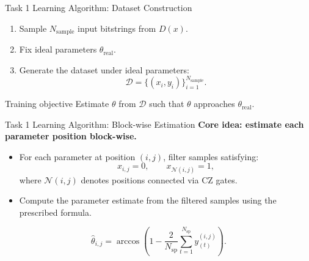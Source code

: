 \documentclass[aspectratio=169]{beamer}
\begin{document}
\begin{frame}{Task 1 Learning Algorithm: Dataset Construction}
  \begin{enumerate}
    \item Sample $N_{\mathrm{sample}}$ input bitstrings from $D(x)$.
    \item Fix ideal parameters $\theta_{\mathrm{real}}$.
    \item Generate the dataset under ideal parameters:
    \[
      \mathcal D = \{(x_i,y_i)\}_{i=1}^{N_{\mathrm{sample}}}.
    \]
  \end{enumerate}

  \vspace{0.25em}
  \begin{block}{Training objective}
    Estimate $\theta$ from $\mathcal D$ such that $\theta$ approaches $\theta_{\mathrm{real}}$.
  \end{block}
\end{frame}

\begin{frame}{Task 1 Learning Algorithm: Block-wise Estimation}
  \small
  {\bfseries Core idea: estimate each parameter position block-wise.}
  \begin{itemize}
    \item For each parameter at position $(i,j)$, filter samples satisfying:
    \[
      x_{i,j}=0,\qquad x_{\mathcal N(i,j)}=1,
    \]
    where $\mathcal N(i,j)$ denotes positions connected via CZ gates.
    \item Compute the parameter estimate from the filtered samples using the prescribed formula.
  \end{itemize}

  \[
    \hat\theta_{i,j}=\arccos\!\left(1-\frac{2}{N_{\mathrm{sp}}}\sum_{t=1}^{N_{\mathrm{sp}}}y^{(i,j)}_{(t)}\right).
  \]
\end{frame}
\end{document}
